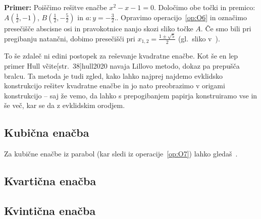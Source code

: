 \textbf{Primer:} Poiščimo rešitve enačbe $x^2 - x - 1 = 0$. Določimo obe točki in premico: $A(\frac{1}{2}, -1)$, $B(\frac{1}{2}, -\frac{5}{2})$ in $a: y = -\frac{3}{2}.$. Opravimo operacijo~\ref{op:O6} in označimo presečišče abscisne osi in pravokotnice nanjo skozi sliko točke $A$. Če smo bili pri pregibanju natančni, dobimo presečišči pri $x_{1,2} = \frac{1 \pm \sqrt{5}}{2}$ (gl.\ sliko v~\cite[str.\ 37]{hull2020}).

To še zdaleč ni edini postopek za reševanje kvadratne enačbe. Kot še en lep primer Hull v\~cite[str.\ 38]{hull2020} navaja Lillovo metodo, dokaz pa prepušča bralcu. Ta metoda je tudi zgled, kako lahko najprej najdemo evklidsko konstrukcijo rešitev kvadratne enačbe in jo nato preobrazimo v origami konstrukcijo -- saj že vemo, da lahko s prepogibanjem papirja konstruiramo vse in še več, kar se da z evklidskim orodjem.

\subsection{Kubična enačba}


Za kubične enačbe iz parabol (kar sledi iz operacije~\ref{op:O7}) lahko gledaš~\cite[str.\ 150]{geometricconstructions}.

\subsection{Kvartična enačba}

\subsection{Kvintična enačba}